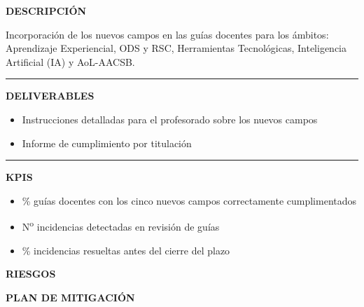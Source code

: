 \documentclass[11pt,a4paper]{scrreprt}
\newcommand{\fieldlabel}[1]{%
  {\footnotesize\sffamily\bfseries\color{mutedcolor}\MakeUppercase{#1}}\par\nopagebreak[4]
}
\newcommand{\fieldsep}{\vspace{3pt}\noindent\textcolor{bordercolor}{\rule{\linewidth}{0.4pt}}\vspace{3pt}\par}
\begin{document}
\begin{tcolorbox}[pabox={gobcolor}{PA3.2 \enspace\textbullet\enspace Actualización de guías docentes}]

\fieldlabel{Descripci\'on}
{\small Incorporación de los nuevos campos en las guías docentes para los ámbitos: Aprendizaje Experiencial, ODS y RSC, Herramientas Tecnológicas, Inteligencia Artificial (IA) y AoL-AACSB.}\par
\fieldsep
\fieldlabel{Deliverables}
{\small \begin{itemize}[noitemsep,topsep=2pt]
\item Instrucciones detalladas para el profesorado sobre los nuevos campos
\item Informe de cumplimiento por titulación
\end{itemize}}\par
\fieldsep
\fieldlabel{KPIs}
{\small \begin{itemize}[noitemsep,topsep=2pt]
\item \% guías docentes con los cinco nuevos campos correctamente cumplimentados
\item N\textsuperscript{o} incidencias detectadas en revisión de guías
\item \% incidencias resueltas antes del cierre del plazo
\end{itemize}}\par
\end{tcolorbox}
\begin{tcolorbox}[riskbox]
{\footnotesize\sffamily\bfseries\color{red!50!black} RIESGOS}\par{}
\end{tcolorbox}
\begin{tcolorbox}[mitbox]
{\footnotesize\sffamily\bfseries\color{green!40!black} PLAN DE MITIGACI\'ON}\par{}
\end{tcolorbox}
\vspace{8pt}
\end{document}
